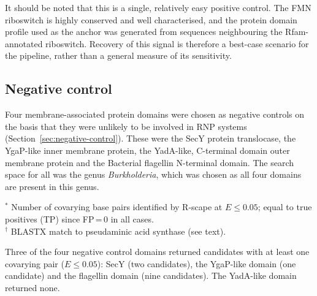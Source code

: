 It should be noted that this is a single, relatively easy positive control.
The \ac{FMN} riboswitch is highly conserved and well characterised, and the protein domain profile used as the anchor was generated from sequences neighbouring the Rfam-annotated riboswitch.
Recovery of this signal is therefore a best-case scenario for the pipeline, rather than a general measure of its sensitivity.

\subsection{Negative control}

Four membrane-associated protein domains were chosen as negative controls on the basis that they were unlikely to be involved in \ac{RNP} systems (Section~\ref{sec:negative-control}).
These were the SecY protein translocase, the YgaP-like inner membrane protein, the YadA-like, C-terminal domain outer membrane protein and the Bacterial flagellin N-terminal domain.
The search space for all was the genus \emph{Burkholderia}, which was chosen as all four domains are present in this genus.

\begin{table}[H]
\centering
\footnotesize
\caption[Negative control candidates]{\textbf{Negative control candidates.}
    The SecY protein translocase (IPR002208, PF00538), the YgaP-like inner membrane protein (IPR021309, PF03471) and the bacterial flagellin N-terminal domain (IPR001029, PF00669) were screened in both directions and produced clusters with significant covarying pairs ($E \le 0.05$).
    YadA-like membrane anchor domain (IPR005594, PF03895) was also screened in both directions but produced no clusters with a significant covarying pair.
    Candidates are grouped by domain and ordered by F-measure within each domain.
}
\label{tab:negative_control_candidates}
    

\par\smallskip
\begin{minipage}{\textwidth}
\raggedright
$^{*}$ Number of covarying base pairs identified by R-scape at $E \le 0.05$; equal to true positives (TP) since FP\,=\,0 in all cases.\\
$^{\dagger}$ BLASTX match to pseudaminic acid synthase (see text).
\end{minipage}
\end{table}

Three of the four negative control domains returned candidates with at least one covarying pair ($E \le 0.05$): SecY (two candidates), the YgaP-like domain (one candidate) and the flagellin domain (nine candidates).
The YadA-like domain returned none.


